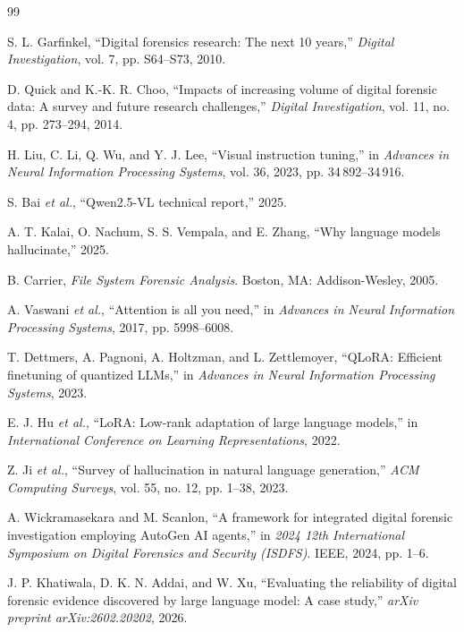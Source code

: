 \documentclass[conference]{IEEEtran}
\begin{document}
\begin{thebibliography}{99}

 S. L. Garfinkel, ``Digital forensics research: The next 10 years,'' \emph{Digital
Investigation}, vol. 7, pp. S64--S73, 2010.

 D. Quick and K.-K. R. Choo, ``Impacts of increasing volume of digital forensic data: A survey
and future research challenges,'' \emph{Digital Investigation}, vol. 11, no. 4, pp. 273--294, 2014.

 H. Liu, C. Li, Q. Wu, and Y. J. Lee, ``Visual instruction tuning,'' in \emph{Advances in Neural
Information Processing Systems}, vol. 36, 2023, pp. 34\,892--34\,916.

 S. Bai \emph{et al.}, ``Qwen2.5-VL technical report,'' 2025.

 A. T. Kalai, O. Nachum, S. S. Vempala, and E. Zhang, ``Why language models hallucinate,''
2025.

 B. Carrier, \emph{File System Forensic Analysis}. Boston, MA: Addison-Wesley, 2005.

 A. Vaswani \emph{et al.}, ``Attention is all you need,'' in \emph{Advances in Neural
Information Processing Systems}, 2017, pp. 5998--6008.

 T. Dettmers, A. Pagnoni, A. Holtzman, and L. Zettlemoyer, ``QLoRA: Efficient finetuning of
quantized LLMs,'' in \emph{Advances in Neural Information Processing Systems}, 2023.

 E. J. Hu \emph{et al.}, ``LoRA: Low-rank adaptation of large language models,'' in
\emph{International Conference on Learning Representations}, 2022.

 Z. Ji \emph{et al.}, ``Survey of hallucination in natural language generation,'' \emph{ACM
Computing Surveys}, vol. 55, no. 12, pp. 1--38, 2023.

 A. Wickramasekara and M. Scanlon, ``A framework for integrated digital forensic
investigation employing AutoGen AI agents,'' in \emph{2024 12th International Symposium on Digital Forensics and
Security (ISDFS)}. IEEE, 2024, pp. 1--6.

 J. P. Khatiwala, D. K. N. Addai, and W. Xu, ``Evaluating the reliability of digital
forensic evidence discovered by large language model: A case study,'' \emph{arXiv preprint arXiv:2602.20202},
2026.


\end{thebibliography}
\end{document}
